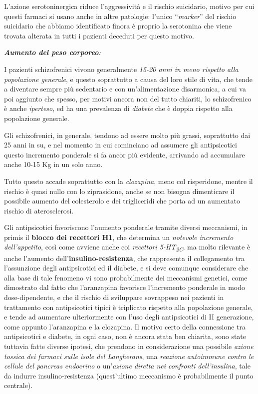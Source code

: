 \documentclass[]{article}
\begin{document}
L'azione serotoninergica riduce l'aggressività e il rischio suicidario,
motivo per cui questi farmaci si usano anche in altre patologie: l'unico
``\emph{marker}'' del rischio suicidario che abbiamo identificato finora
è proprio la serotonina che viene trovata alterata in tutti i pazienti
deceduti per questo motivo.

\emph{\textbf{Aumento del peso corporeo}:}

I pazienti schizofrenici vivono generalmente \emph{15-20 anni in meno
rispetto alla popolazione generale}, e questo soprattutto a causa del
loro stile di vita, che tende a diventare sempre più sedentario e con
un'alimentazione disarmonica, a cui va poi aggiunto che spesso, per
motivi ancora non del tutto chiariti, lo schizofrenico è anche
\emph{iperteso}, ed ha una prevalenza di \emph{diabete} che è doppia
rispetto alla popolazione generale.

Gli schizofrenici, in generale, tendono ad essere molto più grassi,
soprattutto dai 25 anni in su, e nel momento in cui cominciano ad
assumere gli antipsicotici questo incremento ponderale si fa ancor più
evidente, arrivando ad accumulare anche 10-15 Kg in un solo anno.

Tutto questo accade soprattutto con la \emph{clozapina}, meno col
risperidone, mentre il rischio è quasi nullo con lo ziprasidone, anche
se non bisogna dimenticare il possibile aumento del colesterolo e dei
trigliceridi che porta ad un aumentato rischio di aterosclerosi.

Gli antipsicotici favoriscono l'aumento ponderale tramite diversi
meccanismi, in primis il \textbf{blocco dei recettori H1}, che determina
un \emph{notevole incremento dell'appetito}, così come avviene anche coi
\emph{recettori 5-HT\textsubscript{2C}}, ma molto rilevante è anche
l'aumento dell'\textbf{insulino-resistenza}, che rappresenta il
collegamento tra l'assunzione degli antipsicotici ed il diabete, e si
deve comunque considerare che alla base di tale fenomeno vi sono
probabilmente dei meccanismi genetici, come dimostrato dal fatto che
l'aranzapina favorisce l'incremento ponderale in modo dose-dipendente, e
che il rischio di sviluppare sovrappeso nei pazienti in trattamento con
antipsicotici tipici è triplicato rispetto alla popolazione generale, e
tende ad aumentare ulteriormente con l'uso degli antipsicotici di II
generazione, come appunto l'aranzapina e la clozapina. Il motivo certo
della connessione tra antipsicotici e diabete, in ogni caso, non è
ancora stata ben chiarita, sono state tuttavia fatte diverse ipotesi,
che prendono in considerazione una possibile \emph{azione tossica dei
farmaci sulle isole del Langherans}, una \emph{reazione autoimmune
contro le cellule del pancreas endocrino} o un'\emph{azione diretta nei
confronti dell'insulina}, tale da indurre insulino-resistenza
(quest'ultimo meccanismo è probabilmente il punto centrale).
\end{document}
